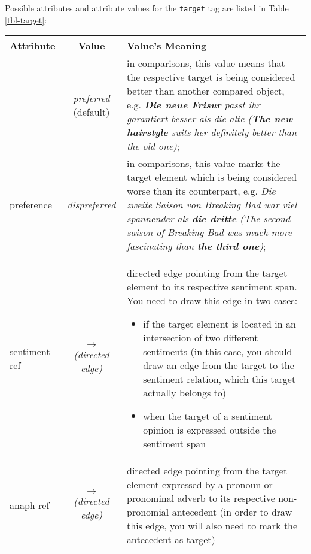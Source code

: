\documentclass[11pt,a4paper]{article}
\newlength\clmnwidth
\begin{document}
Possible attributes and attribute values for the \texttt{target} tag are
listed in Table \ref{tbl-target}:
\begin{center}
  \begin{tabular}{|l|c|p{\clmnwidth}|}\hline
    Attribute & Value & Value's Meaning\\\hline\label{tbl-target}

    & \textit{preferred} (default) & in comparisons, this value means that the
    respective target is being considered better than another compared object,
    e.g. \textit{\textbf{Die neue Frisur} passt ihr garantiert besser als die
      alte (\textbf{The new hairstyle} suits her definitely better than the
      old one)};\\\cline{2-3}

    \multirow{-2}{*}{preference} & \textit{dispreferred} & in
    comparisons, this value marks the target element which is being
    considered worse than its counterpart, e.g. \textit{Die zweite
      Saison von Breaking Bad war viel spannender als \textbf{die
        dritte} (The second saison of Breaking Bad was much more
      fascinating than \textbf{the third one})};\\\hline

    sentiment-ref & \textit{$\longrightarrow$\newline(directed edge)} &
    directed edge pointing from the target element to its respective sentiment
    span.  You need to draw this edge in two cases:
    \begin{itemize}
    \item if the target element is located in an intersection of two different
      sentiments (in this case, you should draw an edge from the target to the
      sentiment relation, which this target actually belongs to)

    \item when the target of a sentiment opinion is expressed outside the
      sentiment span
    \end{itemize}\\\hline

    anaph-ref & \textit{$\longrightarrow$\newline(directed edge)} & directed
    edge pointing from the target element expressed by a pronoun or pronominal
    adverb to its respective non-pronomial antecedent (in order to draw this
    edge, you will also need to mark the antecedent as target)\\\hline
  \end{tabular}
\end{center}
\end{document}
